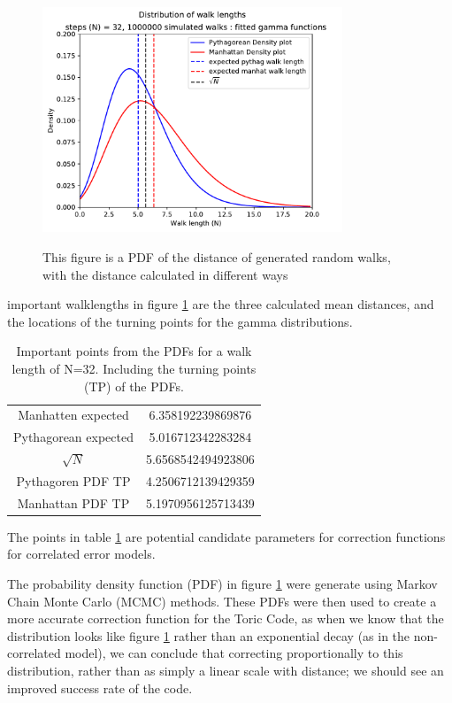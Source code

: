 	\begin{figure}
		\centering
		\includegraphics[width = 0.8\textwidth]{figs/randomwalkdistribution_1000000_32}
		\label{fig:randomwalkdistributions}
		\caption{This figure is a PDF of the distance of generated random walks, with the distance calculated in different ways}
	\end{figure}
	important walklengths in figure \ref{fig:randomwalkdistributions} are the three calculated mean distances, and the locations of the turning points for the gamma distributions. 
	\begin{table}
	\centering
	\begin{tabular}{c c}
	Manhatten expected&  6.358192239869876\\ 
	Pythagorean expected&  5.016712342283284\\ 
	$\sqrt{N}$ &  5.6568542494923806\\ 
	Pythagoren PDF TP &  4.2506712139429359\\ 
	Manhattan PDF TP &  5.1970956125713439\\ 
	\end{tabular} 
	\caption{Important points from the PDFs for a walk length of N=32. Including the turning points (TP) of the PDFs. }
	\label{tab:candidates}
	\end{table}
	The points in table \ref{tab:candidates} are potential candidate parameters for correction functions for correlated error models. 

 	The probability density function (PDF) in figure \ref{fig:randomwalkdistributions} were generate using Markov Chain Monte Carlo (MCMC) methods. These PDFs were then used to create a more accurate correction function for the Toric Code, as when we know that the distribution looks like figure \ref{fig:randomwalkdistributions} rather than an exponential decay (as in the non-correlated model), we can conclude that correcting proportionally to this distribution, rather than as simply a linear scale with distance; we should see an improved success rate of the code. 
 






